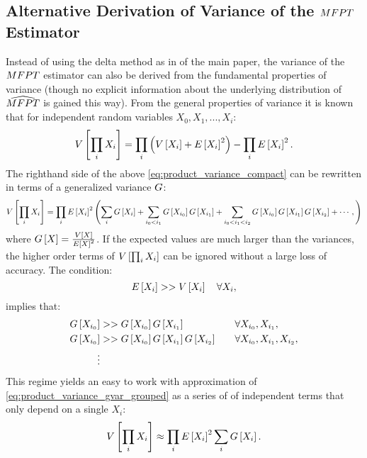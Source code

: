 %
%
%
%

\beginsupplemental

\subsection{Alternative Derivation of Variance of the $MFPT$ Estimator}
\label{sec:sup_alt_var}
Instead of using the delta method as in  of the main paper, the variance of the  $MFPT$ estimator can also be derived from the fundamental properties of variance (though no explicit information about the underlying distribution of $\widehat{MFPT}$ is gained this way). From the general properties of variance it is known that for independent random variables $X_0, X_1, ..., X_i$:
        \begin{equation}
        \label{eq:product_variance_compact}
            V \left[ \prod_i X_i \right] = \prod_i \left(V \left[ X_i \right] + E \left[ X_i \right]^2\right) - \prod_i E \left[ X_i \right]^2.
        \end{equation}
The righthand side of the above \eqref{eq:product_variance_compact} can be rewritten in terms of a generalized variance $G$\supercite{Goodman:1962uc}:
        \begin{equation}
        \label{eq:product_variance_gvar_grouped}
            V \left[ \prod_i X_i \right] = \prod_i E \left[ X_i \right]^2 \left( \sum_i G \left[ X_i \right] + \sum_{i_0 < i_1} G \left[ X_{i_0} \right] G \left[ X_{i_1} \right] + \sum_{i_0 < i_1 < i_2} G \left[ X_{i_0} \right] G \left[ X_{i_1} \right] G \left[ X_{i_2} \right] + \cdots, \right)
        \end{equation}
where $G \left[ X \right] = \frac{V \left[ X \right]}{E \left[ X \right]^2}$. If the expected values are much larger than the variances, the higher order terms of $V \left[ \prod_i X_i \right]$ can be ignored without a large loss of accuracy. The condition:
    \begin{equation}
    \label{eq:product_variance_approx_condition}
        E \left[ X_i \right] >> V \left[ X_i \right] \quad \forall X_i,
    \end{equation}
implies that:
    \begin{align*}
        G \left[ X_{i_0} \right] &>> G \left[ X_{i_0} \right]G \left[ X_{i_1} \right] &\quad &\forall X_{i_0}, X_{i_1}, \\
        G \left[ X_{i_0} \right] &>> G \left[ X_{i_0} \right]G \left[ X_{i_1} \right]G \left[ X_{i_2} \right] &\quad &\forall X_{i_0}, X_{i_1}, X_{i_2},\\
        \vdots
    \end{align*}
This regime yields an easy to work with approximation of \eqref{eq:product_variance_gvar_grouped} as a series of of independent terms that only depend on a single $X_i$:
    \begin{equation}
    \label{eq:product_variance_approx}
        V \left[ \prod_i X_i \right] \approx \prod_i E \left[ X_i \right]^2 \sum_i G \left[ X_i \right].
    \end{equation}

